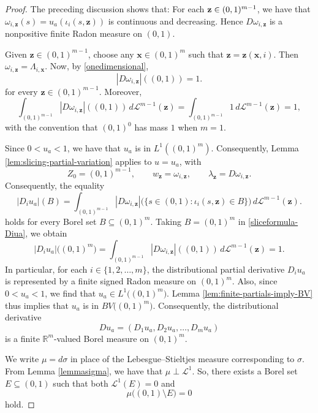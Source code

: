 \documentclass[10pt,a4paper]{amsart}
\begin{document}
\begin{proof}
 The preceding discussion shows that: For each $ \text{{\bf z}} \in (0,1)^{m-1}$, we have that 
$
\omega_{i,\mathbf z}(s)=u_a(\iota_i(s,\mathbf z))
$
is continuous and decreasing. Hence \(D\omega_{i,\mathbf z}\) is a nonpositive finite Radon measure on
\((0,1)\).

Given \(\mathbf z\in(0,1)^{m-1}\), choose any
$\mathbf x\in(0,1)^m$ such that
$
\mathbf z=\mathbf z(\mathbf x,i)$. 
Then
$
\omega_{i,\mathbf z}=\Lambda_{i,\mathbf x}$. Now, by \eqref{onedimensional},
\begin{equation}\label{onedimensional-omega}
|D\omega_{i,\mathbf z}|((0,1))=1.
\end{equation}
for every \(\mathbf z\in(0,1)^{m-1}\).
 Moreover,
\[
\int_{(0,1)^{m-1}}
|D\omega_{i,\mathbf z}|((0,1))\,d\mathcal L^{m-1}(\mathbf z)
=
\int_{(0,1)^{m-1}}1\,d\mathcal L^{m-1}(\mathbf z)
=
1,
\]
with the convention that \((0,1)^0\) has mass \(1\) when \(m=1\).

Since $0 < u_a < 1$,   we have that   $  u_a$ is in $ L^1((0,1)^m)$. Consequently, Lemma \ref{lem:slicing-partial-variation} applies to \(u=u_a\), with
$$
Z_0=(0,1)^{m-1},
\qquad
w_{\mathbf z}=\omega_{i,\mathbf z},
\qquad   \lambda_{\mathbf z}=D\omega_{i,\mathbf z}. $$ Consequently, the equality 
\begin{equation}\label{sliceformula-Diua}
|D_i u_a|(B) = \int_{(0,1)^{m-1}}
|D\omega_{i,\mathbf z}|
\bigl(\{s\in(0,1):\iota_i(s,\mathbf z)\in B\}\bigr)
\,d\mathcal L^{m-1}(\mathbf z).
\end{equation}
 holds for every Borel set $B\subseteq(0,1)^m$.  Taking $B = (0,1)^m$ in  \eqref{sliceformula-Diua}, we obtain
\begin{equation}\label{latersummand}
\left|D_i u_a\right|\big((0,1)^m\big) = \int_{(0,1)^{m-1}}
|D\omega_{i,\mathbf z}|((0,1))
\,d\mathcal L^{m-1}(\mathbf z)  = 1. 
\end{equation}
 In particular, for each $i \in \{1, 2, \ldots, m\}$, the distributional partial derivative \(D_i u_a\) is represented by a finite signed Radon measure on $(0,1)^m$. Also, 
 since $0 < u_a < 1$, we find that $u_a \in L^1\big( (0,1)^m \big)$. Lemma \ref{lem:finite-partials-imply-BV} thus implies that
$ u_a$ is in $ BV\big( (0,1)^m \big)$. Consequently, the distributional derivative 
 $$ Du_a=(D_1u_a,D_2u_a,\ldots,D_m u_a) $$
is a finite \(\mathbb R^m\)-valued Borel measure on \((0,1)^m\).

 We write $\mu = d \sigma$ in place of the Lebesgue--Stieltjes measure corresponding to $\sigma$. From Lemma \ref{lemmasigma}, we have that $\mu \perp \mathcal{L}^{1}$. So, there 
 exists a Borel set $E \subseteq (0, 1)$ such that both $\mathcal{L}^{1}(E) = 0$ and 
\begin{equation}\label{muconcentrated} 
 \mu\big( (0, 1) \setminus E \big) = 0
\end{equation}
 hold. 


\end{proof}
\end{document}

